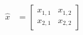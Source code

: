 \begin{align}
    \hat{x} &= \begin{bmatrix}
           x_{1,1} & x_{1,2} \\
           x_{2,1} & x_{2,2}
         \end{bmatrix}
\end{align}